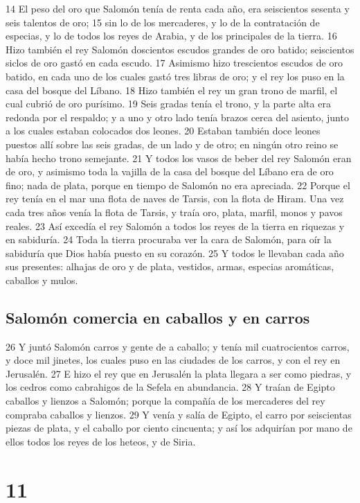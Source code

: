 
14 El peso del oro que Salomón tenía de renta cada año, era seiscientos sesenta y seis talentos de oro;
15 sin lo de los mercaderes, y lo de la contratación de especias, y lo de todos los reyes de Arabia, y de los principales de la tierra.
16 Hizo también el rey Salomón doscientos escudos grandes de oro batido; seiscientos siclos de oro   gastó en cada escudo.
17 Asimismo hizo trescientos escudos de oro batido, en cada uno de los cuales gastó tres libras de oro; y el rey los puso en la casa del bosque del Líbano.
18 Hizo también el rey un gran trono de marfil, el cual cubrió de oro purísimo.
19 Seis gradas tenía el trono, y la parte alta era redonda por el respaldo; y a uno y otro lado tenía brazos cerca del asiento, junto a los cuales estaban colocados dos leones.
20 Estaban también doce leones puestos allí sobre las seis gradas, de un lado y de otro; en ningún otro reino se había hecho trono semejante.
21 Y todos los vasos de beber del rey Salomón eran de oro, y asimismo toda la vajilla de la casa del bosque del Líbano era de oro fino; nada de plata, porque en tiempo de Salomón no era apreciada.
22 Porque el rey tenía en el mar una flota de naves de Tarsis, con la flota de Hiram. Una vez cada tres años venía la flota de Tarsis, y traía oro, plata, marfil, monos y pavos reales.
23 Así excedía el rey Salomón a todos los reyes de la tierra en riquezas y en sabiduría.
24 Toda la tierra procuraba ver la cara de Salomón, para oír la sabiduría que Dios había puesto en su corazón.
25 Y todos le llevaban cada año sus presentes: alhajas de oro y de plata, vestidos, armas, especias aromáticas, caballos y mulos.
\section*{Salomón comercia en caballos y en carros}

26 Y juntó Salomón carros y gente de a caballo; y tenía mil cuatrocientos carros, y doce mil jinetes, los cuales puso en las ciudades de los carros, y con el rey en Jerusalén.
27 E hizo el rey que en Jerusalén la plata llegara a ser como piedras, y los cedros como cabrahigos de la Sefela en abundancia.
28 Y traían de Egipto caballos y lienzos a Salomón; porque la compañía de los mercaderes del rey compraba caballos y lienzos.
29 Y venía y salía de Egipto, el carro por seiscientas piezas de plata, y el caballo por ciento cincuenta; y así los adquirían por mano de ellos todos los reyes de los heteos, y de Siria.

\chapter{11}


